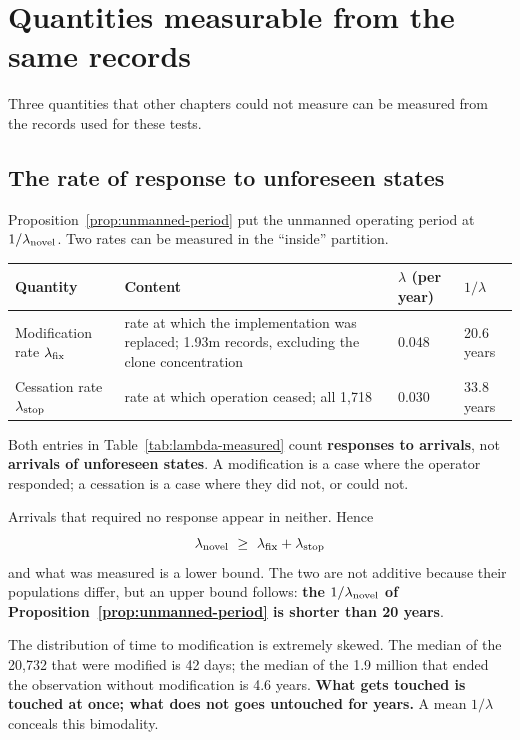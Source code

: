 \section{Quantities measurable from the same records}
\label{sec:protocol-byproducts}

Three quantities that other chapters could not measure can be measured from the records used
for these tests.

\subsection{The rate of response to unforeseen states}
Proposition~\ref{prop:unmanned-period} put the unmanned operating period at
$1/\lambda_{\rm novel}$. Two rates can be measured in the ``inside'' partition.

\begin{center}
\begin{tabularx}{\textwidth}{@{}lXll@{}}
\toprule
Quantity & Content & $\lambda$ (per year) & $1/\lambda$ \\
\midrule
Modification rate $\lambda_{\rm fix}$ & rate at which the implementation was replaced; 1.93m records, excluding the clone concentration & 0.048 & 20.6 years \\
Cessation rate $\lambda_{\rm stop}$ & rate at which operation ceased; all 1{,}718 & 0.030 & 33.8 years \\
\bottomrule
\end{tabularx}
\label{tab:lambda-measured}
\end{center}

\begin{remark}
\label{rem:lambda-is-response}
Both entries in Table~\ref{tab:lambda-measured} count \textbf{responses to arrivals}, not
\textbf{arrivals of unforeseen states}. A modification is a case where the operator
responded; a cessation is a case where they did not, or could not.

Arrivals that required no response appear in neither. Hence
\[
\lambda_{\rm novel}\ \geq\ \lambda_{\rm fix}+\lambda_{\rm stop}
\]
and what was measured is a lower bound. The two are not additive because their populations
differ, but an upper bound follows:
\textbf{the $1/\lambda_{\rm novel}$ of Proposition~\ref{prop:unmanned-period} is shorter than
20 years}.

The distribution of time to modification is extremely skewed. The median of the 20{,}732 that
were modified is 42 days; the median of the 1.9 million that ended the observation without
modification is 4.6 years.
\textbf{What gets touched is touched at once; what does not goes untouched for years.}
A mean $1/\lambda$ conceals this bimodality.
\end{remark}

